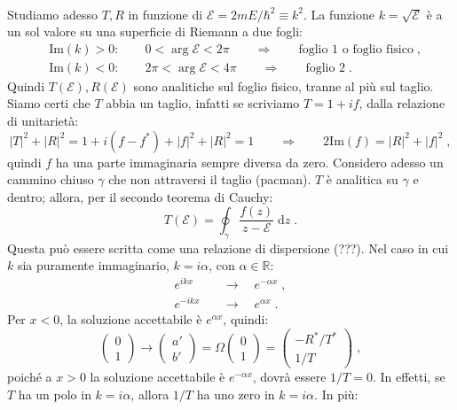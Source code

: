 \documentclass[10pt,a4paper]{report}
\theoremstyle{definition}
\numberwithin{equation}{section}
\newcommand{\diff}[1][]{\mathrm{d}#1}
\begin{document}
\\
Studiamo adesso $T,R$ in funzione di $\mathcal{E}=2mE/\hbar^2\equiv k^2$. La funzione $k=\sqrt{\mathcal{E}}$ è a un sol valore su una superficie di Riemann a due fogli:
\begin{align*}
&\mathrm{Im}(k)>0: \qquad 0<\arg\mathcal{E}<2\pi \qquad \Longrightarrow \qquad \mbox{foglio 1 o foglio fisico}\;, \\
&\mathrm{Im}(k)<0: \qquad 2\pi<\arg\mathcal{E}<4\pi \qquad \Longrightarrow \qquad \mbox{foglio 2}\;.
\end{align*}
Quindi $T(\mathcal{E}),R(\mathcal{E})$ sono analitiche sul foglio fisico, tranne al più sul taglio. Siamo certi che $T$ abbia un taglio, infatti se scriviamo $T=1+if$, dalla relazione di unitarietà:
\begin{equation}
|T|^2+|R|^2=1+i(f-f^*)+|f|^2+|R|^2=1 \qquad \Longrightarrow \qquad 2\mathrm{Im}(f)=|R|^2+|f|^2\;,
\end{equation}
quindi $f$ ha una parte immaginaria sempre diversa da zero. Considero adesso un cammino chiuso $\gamma$ che non attraversi il taglio (pacman). $T$ è analitica su $\gamma$ e dentro; allora, per il secondo teorema di Cauchy:
\begin{equation}
T(\mathcal{E})=\oint_{\gamma} \frac{f(z)}{z-\mathcal{E}}\;\diff{z}\;.
\end{equation}
Questa può essere scritta come una relazione di dispersione (???). Nel caso in cui $k$ sia puramente immaginario, $k=i\alpha$, con $\alpha\in\mathbb{R}$:
\begin{align*}
e^{ikx}\quad &\longrightarrow \quad e^{-\alpha x}\;, \\
e^{-ikx}\quad &\longrightarrow \quad e^{\alpha x}\;.
\end{align*}
Per $x<0$, la soluzione accettabile è $e^{\alpha x}$, quindi:
$$
\left(\begin{matrix}
0 \\
1
\end{matrix}\right) \longrightarrow \left(
\begin{matrix}
a' \\
b'
\end{matrix}\right)=\Omega\left(\begin{matrix}
0 \\
1
\end{matrix}\right)=\left(\begin{matrix}
-R^*/T^* \\
1/T
\end{matrix}\right)\;,
$$
poiché a $x>0$ la soluzione accettabile è $e^{-\alpha x}$, dovrà essere $1/T=0$. In effetti, se $T$ ha un polo in $k=i\alpha$, allora $1/T$ ha uno zero in $k=i\alpha$. In più:
\end{document}
